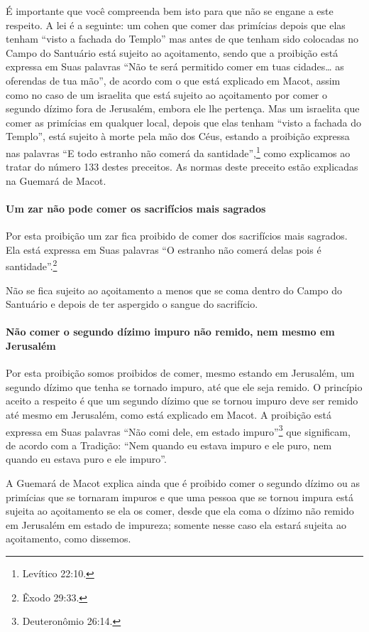 \begin{multicols}{2}
É importante que você compreenda bem isto para que não se engane a este
respeito. A lei é a seguinte: um cohen\starr{} que comer das primícias
depois que elas tenham ``visto a fachada do Templo'' mas antes de que
tenham sido colocadas no Campo do Santuário está sujeito ao açoitamento,
sendo que a proibição está expressa em Suas palavras ``Não te será
permitido comer em tuas cidades\ldots{} as oferendas de tua mão'', de acordo
com o que está explicado em Macot\starr, assim como no caso de um israelita
que está sujeito ao açoitamento por comer o segundo dízimo fora de
Jerusalém, embora ele lhe pertença. Mas um israelita que comer as
primícias em qualquer local, depois que elas tenham
``visto a fachada do Templo'', está sujeito à morte pela mão dos Céus,
estando
a proibição expressa nas palavras ``E todo estranho não comerá da
santidade'',\footnote{Levítico 22:10.} como explicamos ao tratar do número 133
destes preceitos.
As normas deste preceito estão explicadas na Guemará\starr{} de Macot\starr.

\paragraph{Um zar\starr{} não pode comer os sacrifícios mais sagrados}

Por esta proibição um zar\starr{} fica proibido de
comer dos sacrifícios mais sagrados. Ela está expressa em Suas palavras
``O estranho não comerá delas pois é santidade''.\footnote{Êxodo 29:33.}

Não se fica sujeito ao açoitamento a menos que se coma dentro do Campo
do Santuário e depois de ter aspergido o sangue do sacrifício.

\paragraph{Não comer o segundo dízimo impuro não remido, nem mesmo em Jerusalém}

Por esta proibição somos proibidos de comer, mesmo estando em Jerusalém,
um segundo dízimo que tenha se tornado impuro, até que ele seja remido.
O princípio aceito a respeito é que um segundo dízimo que se tornou
impuro deve ser remido até mesmo em Jerusalém, como está explicado em
Macot\starr. A proibição está expressa em Suas palavras ``Não comi dele, em
estado impuro''\footnote{Deuteronômio 26:14.} que significam, de acordo com a
Tradição: ``Nem quando eu estava impuro e ele puro, nem quando eu estava
puro e ele impuro''.

A Guemará\starr{} de Macot\starr{} explica ainda que é proibido comer o segundo dízimo
ou as primícias que se tornaram impuros e que uma pessoa que se tornou
impura está sujeita ao açoitamento se ela os comer, desde que ela coma o
dízimo não remido em Jerusalém em estado de impureza; somente nesse
caso ela estará sujeita ao açoitamento, como dissemos.


\end{multicols}

